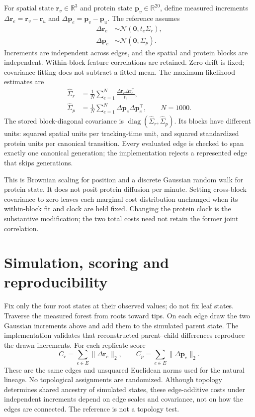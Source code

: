 \documentclass[10pt,letterpaper]{article}
\newcommand{\Normal}{\mathcal N}
\begin{document}
For spatial state $\mathbf r_v\in\mathbb R^3$ and protein state
$\mathbf p_v\in\mathbb R^{20}$, define measured increments
$\Delta\mathbf r_e=\mathbf r_v-\mathbf r_u$ and
$\Delta\mathbf p_e=\mathbf p_v-\mathbf p_u$. The reference assumes
\begin{align}
 \Delta\mathbf r_e &\sim \Normal(\mathbf0,t_e\Sigma_r),\\
 \Delta\mathbf p_e &\sim \Normal(\mathbf0,\Sigma_p).
\end{align}
Increments are independent across edges, and the spatial and protein blocks
are independent. Within-block feature correlations are retained. Zero drift
is fixed; covariance fitting does not subtract a fitted mean.
The maximum-likelihood estimates are
\begin{align}
 \widehat\Sigma_r &= \frac1N\sum_{e=1}^N
     \frac{\Delta\mathbf r_e\Delta\mathbf r_e^\top}{t_e},\\
 \widehat\Sigma_p &= \frac1N\sum_{e=1}^N
     \Delta\mathbf p_e\Delta\mathbf p_e^\top,
 \qquad N=1000.
\end{align}
The stored block-diagonal covariance is
$\operatorname{diag}(\widehat\Sigma_r,\widehat\Sigma_p)$.
Its blocks have different units: squared spatial units per tracking-time
unit, and squared standardized protein units per canonical transition.
Every evaluated edge is checked to span exactly one canonical generation;
the implementation rejects a represented edge that skips generations.

This is Brownian scaling for position and a discrete Gaussian random walk
for protein state. It does not posit protein diffusion per minute. Setting
cross-block covariance to zero leaves each marginal cost distribution
unchanged when its within-block fit and clock are held fixed. Changing the
protein clock is the substantive modification; the two total costs need
not retain the former joint correlation.

\section{Simulation, scoring and reproducibility}

Fix only the four root states at their observed values; do not fix leaf states.
Traverse the measured
forest from roots toward tips. On each edge draw the two Gaussian increments
above and add them to the simulated parent state. The implementation validates
that reconstructed parent--child differences reproduce the drawn increments.
For each replicate score
\[
 C_r=\sum_{e\in E}\|\Delta\mathbf r_e\|_2,
 \qquad C_p=\sum_{e\in E}\|\Delta\mathbf p_e\|_2.
\]
These are the same edges and unsquared Euclidean norms used for the natural
lineage. No topological assignments are randomized. Although topology
determines shared ancestry of simulated states, these edge-additive costs
under independent increments depend on edge scales and covariance, not on
how the edges are connected. The reference is not a topology test.
\end{document}
